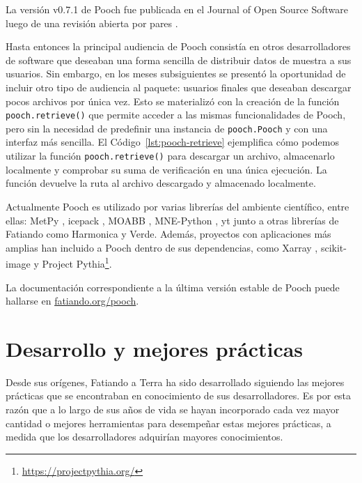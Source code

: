 La versión v0.7.1 de Pooch fue publicada en el Journal of Open Source
Software luego de una revisión abierta por pares \citep{pooch2020}.



Hasta entonces la principal audiencia de Pooch consistía en otros
desarrolladores de software que deseaban una forma sencilla de distribuir datos
de muestra a sus usuarios.
Sin embargo, en los meses subsiguientes se presentó la oportunidad de incluir
otro tipo de audiencia al paquete: usuarios finales que deseaban descargar
pocos archivos por única vez.
Esto se materializó con la creación de la función \texttt{pooch.retrieve()} que
permite acceder a las mismas funcionalidades de Pooch, pero sin la
necesidad de predefinir una instancia de \texttt{pooch.Pooch} y con una
interfaz más sencilla.
El Código~\ref{lst:pooch-retrieve} ejemplifica cómo podemos utilizar la función
\texttt{pooch.retrieve()} para descargar un archivo, almacenarlo localmente
y comprobar su suma de verificación en una única ejecución.
La función devuelve la ruta al archivo descargado y almacenado localmente.

Actualmente Pooch es utilizado por varias librerías del ambiente
científico, entre ellas: MetPy \citep{metpy}, icepack \citep{icepack}, MOABB
\citep{moabb}, MNE-Python \citep{mnepython}, yt \citep{yt2010} junto a otras
librerías de Fatiando como Harmonica y Verde.
Además, proyectos con aplicaciones más amplias han incluido a Pooch
dentro de sus dependencias, como Xarray \citep{xarray2017}, scikit-image
\citep{skimage} y Project Pythia\footnote{\url{https://projectpythia.org/}}.

La documentación correspondiente a la última versión estable de Pooch
puede hallarse en \href{https://www.fatiando.org/pooch}{fatiando.org/pooch}.


\section{Desarrollo y mejores prácticas}
\label{sec:best-practices}

Desde sus orígenes, Fatiando a Terra ha sido desarrollado siguiendo las mejores
prácticas que se encontraban en conocimiento de sus desarrolladores.
Es por esta razón que a lo largo de sus años de vida se hayan incorporado cada
vez mayor cantidad o mejores herramientas para desempeñar estas mejores
prácticas, a medida que los desarrolladores adquirían mayores conocimientos.

